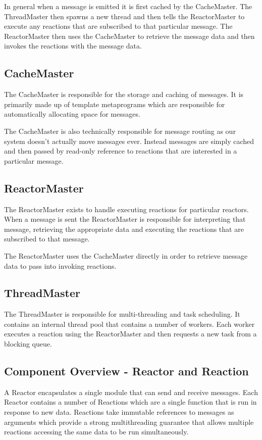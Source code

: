 \documentclass[english,12pt]{scrartcl}
\begin{document}
			In general when a message is emitted it is first cached by the CacheMaster. 
			The ThreadMaster then spawns a new thread and then tells the ReactorMaster to execute any reactions that are subscribed to that particular message. 
			The ReactorMaster then uses the CacheMaster to retrieve the message data and then invokes the reactions with the message data.
	
			\subsection{CacheMaster}
				The CacheMaster is responsible for the storage and caching of messages.
				It is primarily made up of template metaprograms which are responsible for automatically allocating space for messages. 
				
				The CacheMaster is also technically responsible for message routing as our system doesn't actually move messages ever. Instead messages are simply cached and then passed by read-only reference to reactions that are interested in a particular message.
	
			\subsection{ReactorMaster}
				The ReactorMaster exists to handle executing reactions for particular reactors. 
				When a message is sent the ReactorMaster is responsible for interpreting that message, retrieving the appropriate data and executing the reactions that are subscribed to that message.
				
				The ReactorMaster uses the CacheMaster directly in order to retrieve message data to pass into invoking reactions.
	
			\subsection{ThreadMaster}
				The ThreadMaster is responsible for multi-threading and task scheduling.
				It contains an internal thread pool that contains a number of workers. 
				Each worker executes a reaction using the ReactorMaster and then requests a new task from a blocking queue.
		
		\subsection{Component Overview - Reactor and Reaction}
			A Reactor encapsulates a single module that can send and receive messages.
			Each Reactor contains a number of Reactions which are a single function that is run in response to new data. 
			Reactions take immutable references to messages as arguments which provide a strong multithreading guarantee that allows multiple reactions accessing the same data to be run simultaneously.
			
\end{document}

